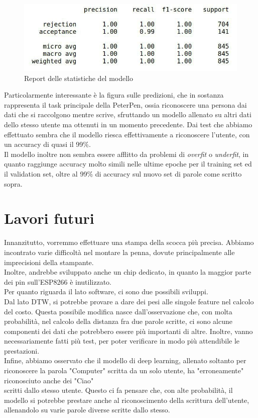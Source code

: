 \documentclass[8pt,notitlepage]{report}
\begin{document}
			\begin{figure}[H]
				\begin{center}
					\includegraphics[scale=.4]{measures_table_LSTM}
					\caption{Report delle statistiche del modello}
				\end{center}
			\end{figure}
			\newpage
			Particolarmente interessante è la figura sulle predizioni, che in sostanza rappresenta il task principale della PeterPen, ossia riconoscere una persona dai dati che si raccolgono mentre scrive, sfruttando un modello allenato su altri dati dello stesso utente ma ottenuti in un momento precedente. Dai test che abbiamo effettuato sembra che il modello riesca effettivamente a riconoscere l'utente, con un accuracy di quasi il 99\%. \\
			Il modello inoltre non sembra essere afflitto da problemi di \textit{overfit} o \textit{underfit}, in quanto raggiunge accuracy molto simili nelle ultime epoche per il training set ed il validation set, oltre al 99\% di accuracy sul nuovo set di parole come scritto sopra. \\


\chapter{Lavori futuri}

	Innanzitutto, vorremmo effettuare una stampa della scocca più precisa. Abbiamo incontrato varie difficoltà nel montare la penna, dovute principalmente alle imprecisioni della stampante. \\
	Inoltre, andrebbe sviluppato anche un chip dedicato, in quanto la maggior parte dei pin sull'ESP8266 è inutilizzato. \\
	Per quanto riguarda il lato software, ci sono due possibili sviluppi. 
	\\ Dal lato DTW, si potrebbe provare a dare dei pesi alle singole feature nel calcolo del costo. Questa possibile modifica nasce dall'osservazione che, con molta probabilità, nel calcolo della distanza fra due parole scritte, ci sono alcune componenti dei dati che potrebbero essere più importanti di altre. Inoltre, vanno necessariamente fatti più test, per poter verificare in modo più attendibile le prestazioni.
	\\ Infine, abbiamo osservato che il modello di deep learning, allenato soltanto per riconoscere la parola "Computer" scritta da un solo utente, ha "erroneamente" riconosciuto anche dei "Ciao" \\ scritti dallo stesso utente. Questo ci fa pensare che, con alte probabilità, il modello si potrebbe prestare anche al riconoscimento della scrittura dell'utente, allenandolo su varie parole diverse scritte dallo stesso.
	
\end{document}
